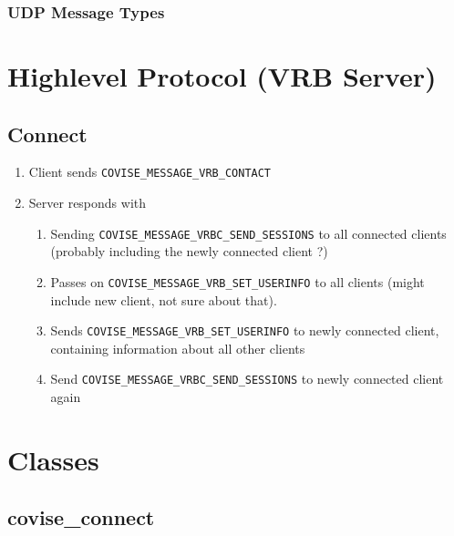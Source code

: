 \subsubsection{UDP Message Types}

\begin{messagetypes}
\end{messagetypes}

\section{Highlevel Protocol (VRB Server)}

\subsection{Connect}

\begin{enumerate}
	\item Client sends \lstinline|COVISE_MESSAGE_VRB_CONTACT|
	\item Server responds with 	
	\begin{enumerate}
		\item Sending \lstinline|COVISE_MESSAGE_VRBC_SEND_SESSIONS| to all connected clients (probably including the newly connected client ?)
		\item Passes on \lstinline|COVISE_MESSAGE_VRB_SET_USERINFO| to all clients (might include new client, not sure about that). 
		\item Sends \lstinline|COVISE_MESSAGE_VRB_SET_USERINFO| to newly connected client, containing information about all other clients
		\item Send \lstinline|COVISE_MESSAGE_VRBC_SEND_SESSIONS| to newly connected client again
	\end{enumerate}
\end{enumerate}


\section{Classes}

\subsection{covise\_connect}

